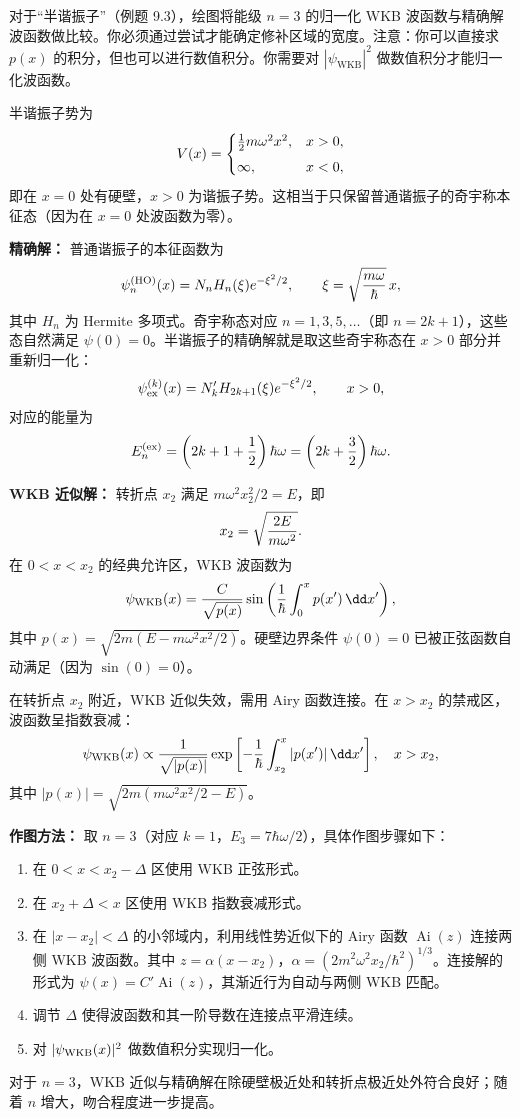 \begin{question}
对于“半谐振子”（例题 9.3），绘图将能级 $n=3$ 的归一化 WKB 波函数与精确解波函数做比较。你必须通过尝试才能确定修补区域的宽度。注意：你可以直接求 $p(x)$ 的积分，但也可以进行数值积分。你需要对 $|\psi_{\mathrm{WKB}}|^2$ 做数值积分才能归一化波函数。
\end{question}
\begin{solution}
半谐振子势为
\[
V(x)=\begin{cases}
{1\over2}m\omega^2x^2, & x>0,\\[4pt]
\infty, & x<0,
\end{cases}
\]
即在 $x=0$ 处有硬壁，$x>0$ 为谐振子势。这相当于只保留普通谐振子的奇宇称本征态（因为在 $x=0$ 处波函数为零）。

\textbf{精确解：} 普通谐振子的本征函数为
\[
\psi_n^{\rm (HO)}(x)=N_n H_n(\xi)e^{-\xi^2/2},
\qquad \xi=\sqrt{m\omega\over\hbar}\,x,
\]
其中 $H_n$ 为 Hermite 多项式。奇宇称态对应 $n=1,3,5,\ldots$（即 $n=2k+1$），这些态自然满足 $\psi(0)=0$。半谐振子的精确解就是取这些奇宇称态在 $x>0$ 部分并重新归一化：
\[
\psi_{\rm ex}^{(k)}(x)=N_k' H_{2k+1}(\xi)e^{-\xi^2/2},\qquad x>0,
\]
对应的能量为
\[
E_n^{\rm (ex)}=\left(2k+1+{1\over2}\right)\hbar\omega
=\left(2k+{3\over2}\right)\hbar\omega.
\]

\textbf{WKB 近似解：} 转折点 $x_2$ 满足 $m\omega^2x_2^2/2=E$，即
\[
x_2=\sqrt{2E\over m\omega^2}.
\]
在 $0<x<x_2$ 的经典允许区，WKB 波函数为
\[
\psi_{\rm WKB}(x)={C\over\sqrt{p(x)}}
\sin\left({1\over\hbar}\int_0^x p(x')\,\dd x'\right),
\]
其中 $p(x)=\sqrt{2m(E-m\omega^2x^2/2)}$。硬壁边界条件 $\psi(0)=0$ 已被正弦函数自动满足（因为 $\sin(0)=0$）。

在转折点 $x_2$ 附近，WKB 近似失效，需用 Airy 函数连接。在 $x>x_2$ 的禁戒区，波函数呈指数衰减：
\[
\psi_{\rm WKB}(x)\propto {1\over\sqrt{|p(x)|}}
\exp\left[-{1\over\hbar}\int_{x_2}^{x}|p(x')|\,\dd x'\right],
\quad x>x_2,
\]
其中 $|p(x)|=\sqrt{2m(m\omega^2x^2/2-E)}$。

\textbf{作图方法：} 取 $n=3$（对应 $k=1$，$E_3=7\hbar\omega/2$），具体作图步骤如下：
\begin{enumerate}
\item 在 $0<x<x_2-\Delta$ 区使用 WKB 正弦形式。
\item 在 $x_2+\Delta<x$ 区使用 WKB 指数衰减形式。
\item 在 $|x-x_2|<\Delta$ 的小邻域内，利用线性势近似下的 Airy 函数 $\operatorname{Ai}(z)$ 连接两侧 WKB 波函数。其中 $z=\alpha(x-x_2)$，$\alpha=(2m^2\omega^2x_2/\hbar^2)^{1/3}$。连接解的形式为 $\psi(x)=C'\operatorname{Ai}(z)$，其渐近行为自动与两侧 WKB 匹配。
\item 调节 $\Delta$ 使得波函数和其一阶导数在连接点平滑连续。
\item 对 $|\psi_{\rm WKB}(x)|^2$ 做数值积分实现归一化。
\end{enumerate}

对于 $n=3$，WKB 近似与精确解在除硬壁极近处和转折点极近处外符合良好；随着 $n$ 增大，吻合程度进一步提高。
\end{solution}

